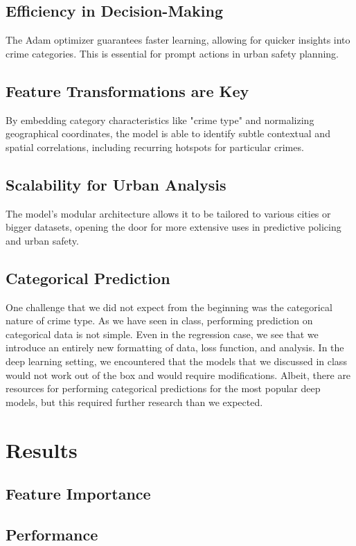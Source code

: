 \documentclass{article}
\begin{document}
\subsection{Efficiency in Decision-Making}
The Adam optimizer guarantees faster learning, allowing for quicker insights into crime categories. This is essential for prompt actions in urban safety planning.

\subsection{Feature Transformations are Key}
By embedding category characteristics like "crime type" and normalizing geographical coordinates, the model is able to identify subtle contextual and spatial correlations, including recurring hotspots for particular crimes.

\subsection{Scalability for Urban Analysis}
The model's modular architecture allows it to be tailored to various cities or bigger datasets, opening the door for more extensive uses in predictive policing and urban safety.

\subsection{Categorical Prediction}
One challenge that we did not expect from the beginning was the categorical nature of crime type. As we have seen in class, performing prediction on categorical data is not simple. Even in the regression case, we see that we introduce an entirely new formatting of data, loss function, and analysis. In the deep learning setting, we encountered that the models that we discussed in class would not work out of the box and would require modifications. Albeit, there are resources for performing categorical predictions for the most popular deep models, but this required further research than we expected. 

\section{Results}

\subsection{Feature Importance}

\subsection{Performance}

\end{document}

